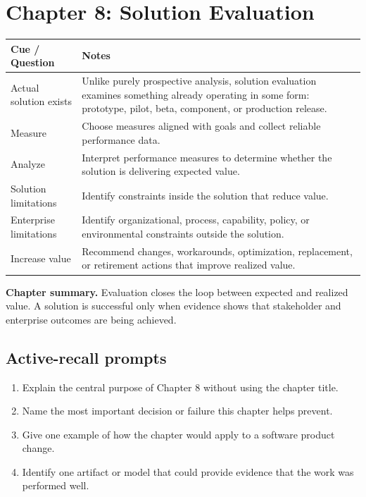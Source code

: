 \documentclass[11pt]{article}
\begin{document}
\section{Chapter 8: Solution Evaluation}
\begin{longtable}{L{0.26\textwidth} L{0.64\textwidth}}
\toprule
\textbf{Cue / Question} & \textbf{Notes}\\
\midrule
\endhead
Actual solution exists & Unlike purely prospective analysis, solution evaluation examines something already operating in some form: prototype, pilot, beta, component, or production release.\\
Measure & Choose measures aligned with goals and collect reliable performance data.\\
Analyze & Interpret performance measures to determine whether the solution is delivering expected value.\\
Solution limitations & Identify constraints inside the solution that reduce value.\\
Enterprise limitations & Identify organizational, process, capability, policy, or environmental constraints outside the solution.\\
Increase value & Recommend changes, workarounds, optimization, replacement, or retirement actions that improve realized value.\\
\bottomrule
\end{longtable}
\begin{keybox}\textbf{Chapter summary.} Evaluation closes the loop between expected and realized value. A solution is successful only when evidence shows that stakeholder and enterprise outcomes are being achieved.\end{keybox}
\subsection*{Active-recall prompts}
\begin{enumerate}
\item Explain the central purpose of Chapter 8 without using the chapter title.
\item Name the most important decision or failure this chapter helps prevent.
\item Give one example of how the chapter would apply to a software product change.
\item Identify one artifact or model that could provide evidence that the work was performed well.
\end{enumerate}
\end{document}
